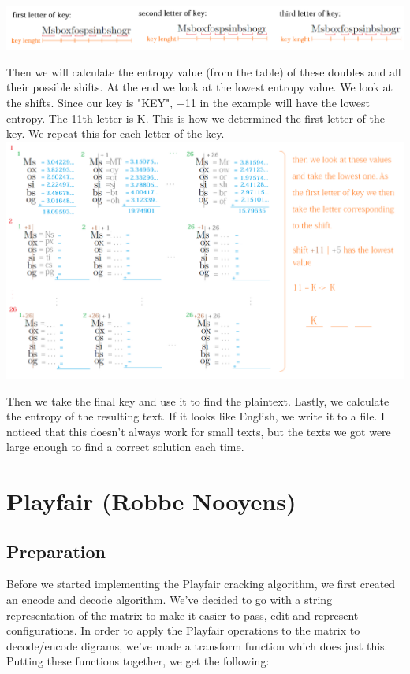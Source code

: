 \documentclass{article}
\begin{document}
\includegraphics[scale=0.60]{image1.png}

\newpage

Then we will calculate the entropy value (from the table) of these doubles and all their possible shifts. At the end we look at the lowest entropy value. We look at the shifts. Since our key is "KEY", +11 in the example will have the lowest entropy. The 11th letter is K. This is how we determined the first letter of the key. We repeat this for each letter of the key.\\

\includegraphics[scale=0.60]{image2.png}

Then we take the final key and use it to find the plaintext. Lastly, we calculate the entropy of the resulting text. If it looks like English, we write it to a file. I noticed that this doesn't always work for small texts, but the texts we got were large enough to find a correct solution each time.

\section{Playfair (Robbe Nooyens)}

\subsection{Preparation}
Before we started implementing the Playfair cracking algorithm, we first created an encode and decode algorithm. We've decided to go with a string representation of the matrix to make it easier to pass, edit and represent configurations. In order to apply the Playfair operations to the matrix to decode/encode digrams, we've made a transform function which does just this. Putting these functions together, we get the following:
\end{document}
